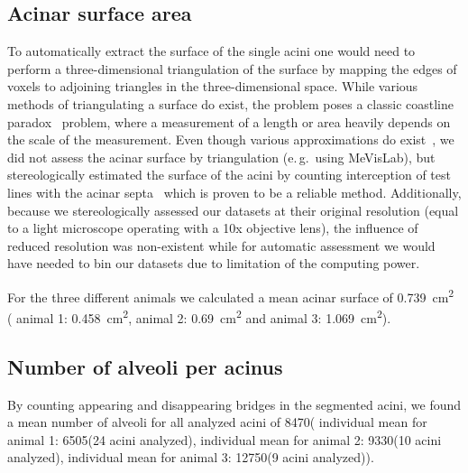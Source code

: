 \documentclass[a4paper,DIV=calc,abstract,english]{scrartcl}
\newcommand{\eg}{e.\,g.\ }
\newcommand{\numberofaciniB}{24}
\newcommand{\numberofaciniD}{10}
\newcommand{\numberofaciniE}{9}
\newcommand{\numberofalveoliB}{6505}
\newcommand{\numberofalveoliD}{9330}
\newcommand{\numberofalveoliE}{12750}
\newcommand{\meannumberofalveoli}{8470} %
\newcommand{\acinarsurfaceB}{0.458} %
\newcommand{\acinarsurfaceD}{0.69} %
\newcommand{\acinarsurfaceE}{1.069} %
\newcommand{\meanacinarsurface}{0.739} %
\newcommand{\airspacesurfaceB}{4214} %
\newcommand{\airspacesurfaceD}{3628} %
\newcommand{\airspacesurfaceE}{5177} %
\newcommand{\meanairspacesurface}{4340} %
\begin{document}
\subsection{Acinar surface area}
To automatically extract the surface of the single acini one would need to perform a three-dimensional triangulation of the surface by mapping the edges of voxels to adjoining triangles in the three-dimensional space.
While various methods of triangulating a surface do exist, the problem poses a classic coastline paradox~\cite{Mandelbrot1967a} problem, where a measurement of a length or area heavily depends on the scale of the measurement.
Even though various approximations do exist~\cite{Lorensen1987,Schneiders1996}, we did not assess the acinar surface by triangulation (\eg using MeVisLab), but stereologically estimated the surface of the acini by counting interception of test lines with the acinar septa~\cite{Hsia2010} which is proven to be a reliable method.
Additionally, because we stereologically assessed our datasets at their original resolution (equal to a light microscope operating with a 10x objective lens), the influence of reduced resolution was non-existent while for automatic assessment we would have needed to bin our datasets due to limitation of the computing power. 

For the three different animals we calculated a mean acinar surface of \SI{\meanacinarsurface}{\centi\metre\squared} (%
animal 1: \SI{\acinarsurfaceB}{\centi\metre\squared},
animal 2: \SI{\acinarsurfaceD}{\centi\metre\squared} and
animal 3: \SI{\acinarsurfaceE}{\centi\metre\squared}).


\subsection{Number of alveoli per acinus}
By counting appearing and disappearing bridges in the segmented acini, we found a mean number of alveoli for all analyzed acini of \meannumberofalveoli\xspace (%
individual mean for animal 1: \numberofalveoliB\xspace (\numberofaciniB\xspace acini analyzed),
individual mean for animal 2: \numberofalveoliD\xspace (\numberofaciniD\xspace acini analyzed),
individual mean for animal 3: \numberofalveoliE\xspace (\numberofaciniE\xspace acini analyzed)).
\end{document}
